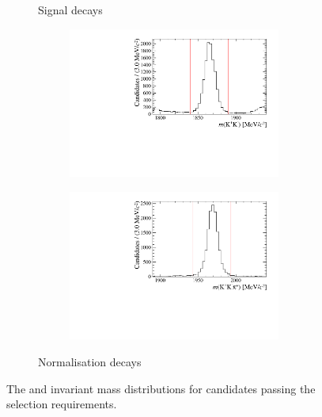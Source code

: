 \begin{figure}[!h]
\begin{subfigure}[t]{1.0\textwidth}
\begin{subfigure}[t]{0.40\textwidth}
      \end{subfigure}
         \caption{Signal \decay{\Bp}{\Dsp\Kp\Km} decays}
   \end{subfigure} 
   \begin{subfigure}[t]{1.0\textwidth}
      \centering
      \begin{subfigure}[t]{0.40\textwidth}
         \centering
         \includegraphics[width=1.0\textwidth]{figs/Selection/Phimass_KKPi_B2DsD0.pdf}
         \caption{\decay{\Dsp}{\Kp\Km\pip}}
      \end{subfigure}
      \begin{subfigure}[t]{0.40\textwidth}
         \centering
         \includegraphics[width=1.0\textwidth]{figs/Selection/Dmass_KKPi_B2DsD0.pdf}
      \end{subfigure}
      \caption{Normalisation \decay{\Bp}{\Dsp\Dzb} decays}
   \end{subfigure}
   \caption{The \Dsp and \Kp\Km invariant mass distributions for \decay{\Bp}{\Dsp\Kp\Km} candidates passing the selection requirements.}
   \label{fig:d_KK_mass}   
\end{figure}

